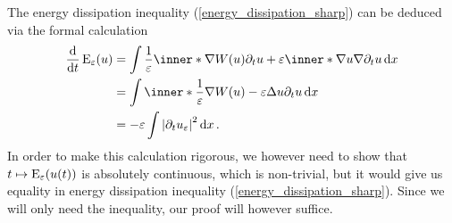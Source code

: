 \begin{remark}
	The energy dissipation inequality (\ref{energy_dissipation_sharp}) can be deduced via the formal calculation 
	\begin{align*}
		\dv{ t } \energy_{ \varepsilon } ( u )
		& =
		\int
		\frac{ 1 }{\varepsilon }
		\inner*{ \nabla W ( u ) }{ \partial_{ t } u }
		+
		\varepsilon
		\inner*{ \nabla u  }{ \nabla \partial_{ t } u }
		\dd{ x }
		\\
		& = 
		\int
		\inner*{ \frac{ 1 }{ \varepsilon } \nabla W ( u ) - \varepsilon \Delta u }{ \partial_{ t } u }
		\dd{ x }
		\\
		& =
		- \varepsilon \int \abs{ \partial_{ t } u_{ \varepsilon } }^{ 2 } \dd{ x }.
	\end{align*}
	In order to make this calculation rigorous, we however need to show that $ t \mapsto \operatorname{E}_{ \varepsilon } ( u ( t ) ) $ is absolutely continuous, which is non-trivial, but it would give us equality in energy dissipation inequality (\ref{energy_dissipation_sharp}).
	Since we will only need the inequality, our proof will however suffice.
\end{remark}